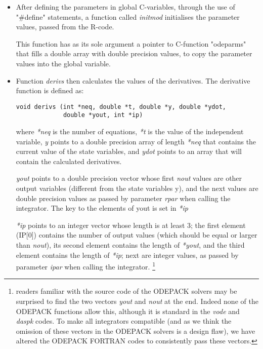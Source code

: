 \documentclass[english]{article}
\begin{document}
\begin{itemize}
\item After defining the parameters in global C-variables, through the use of 
"#define" statements, a function called \emph{initmod} initialises the parameter
values, passed from the R-code. 

This function has as its sole argument a pointer to C-function "odeparms" 
that fills a double array with double precision values, to copy the parameter
values into the global variable.  

\item Function \emph{derivs} then calculates the values
of the derivatives.  The derivative function is defined as: 
\begin{verbatim}
void derivs (int *neq, double *t, double *y, double *ydot,
             double *yout, int *ip)
\end{verbatim}
where \emph{*neq} is the number of equations, \emph{*t} is the value
of the independent variable, \emph{y} points to a double precision
array of length \emph{*neq} that contains the current value of the
state variables, and \emph{ydot} points to an array that will contain
the calculated derivatives.
    
\emph{yout} points to a double precision vector whose first \emph{nout} values are other output variables (different from the state variables y), 
and the next values are double precision values as passed by parameter \emph{rpar} when calling the integrator. 
The key to the elements of yout is set in \emph{*ip}
    
\emph{*ip} points to an integer vector whose length is at least 3; the first element (IP[0]) contains the number of output values (which should be equal or larger than \emph{nout}), 
its second element contains the length of \emph{*yout}, and the third element contains the length of \emph{*ip}; 
next are integer values, as passed by parameter \emph{ipar} when calling the integrator. 
\footnote{readers familiar with the source code of the ODEPACK solvers may be surprised to find 
the two vectors \emph{yout} and \emph{nout} at the end. Indeed none of the ODEPACK
functions allow this, although it is standard in the \emph{vode} and \emph{daspk} codes. 
To make all integrators compatible (and as we think the omission of these vectors in 
the ODEPACK solvers is a design flaw), we have altered the ODEPACK FORTRAN  
codes to consistently pass these vectors. }    


\end{itemize}
\end{document}

